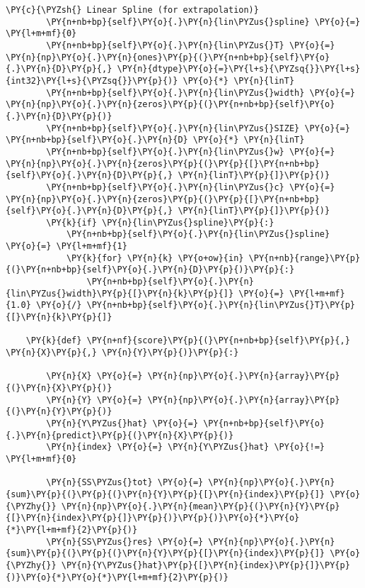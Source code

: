 \begin{Verbatim}[commandchars=\\\{\}]
        \PY{c}{\PYZsh{} Linear Spline (for extrapolation)}
        \PY{n+nb+bp}{self}\PY{o}{.}\PY{n}{lin\PYZus{}spline} \PY{o}{=} \PY{l+m+mf}{0}
        \PY{n+nb+bp}{self}\PY{o}{.}\PY{n}{lin\PYZus{}T} \PY{o}{=} \PY{n}{np}\PY{o}{.}\PY{n}{ones}\PY{p}{(}\PY{n+nb+bp}{self}\PY{o}{.}\PY{n}{D}\PY{p}{,} \PY{n}{dtype}\PY{o}{=}\PY{l+s}{\PYZsq{}}\PY{l+s}{int32}\PY{l+s}{\PYZsq{}}\PY{p}{)} \PY{o}{*} \PY{n}{linT}
        \PY{n+nb+bp}{self}\PY{o}{.}\PY{n}{lin\PYZus{}width} \PY{o}{=} \PY{n}{np}\PY{o}{.}\PY{n}{zeros}\PY{p}{(}\PY{n+nb+bp}{self}\PY{o}{.}\PY{n}{D}\PY{p}{)}
        \PY{n+nb+bp}{self}\PY{o}{.}\PY{n}{lin\PYZus{}SIZE} \PY{o}{=} \PY{n+nb+bp}{self}\PY{o}{.}\PY{n}{D} \PY{o}{*} \PY{n}{linT}
        \PY{n+nb+bp}{self}\PY{o}{.}\PY{n}{lin\PYZus{}w} \PY{o}{=} \PY{n}{np}\PY{o}{.}\PY{n}{zeros}\PY{p}{(}\PY{p}{[}\PY{n+nb+bp}{self}\PY{o}{.}\PY{n}{D}\PY{p}{,} \PY{n}{linT}\PY{p}{]}\PY{p}{)}
        \PY{n+nb+bp}{self}\PY{o}{.}\PY{n}{lin\PYZus{}c} \PY{o}{=} \PY{n}{np}\PY{o}{.}\PY{n}{zeros}\PY{p}{(}\PY{p}{[}\PY{n+nb+bp}{self}\PY{o}{.}\PY{n}{D}\PY{p}{,} \PY{n}{linT}\PY{p}{]}\PY{p}{)}
        \PY{k}{if} \PY{n}{lin\PYZus{}spline}\PY{p}{:}
            \PY{n+nb+bp}{self}\PY{o}{.}\PY{n}{lin\PYZus{}spline} \PY{o}{=} \PY{l+m+mf}{1}
            \PY{k}{for} \PY{n}{k} \PY{o+ow}{in} \PY{n+nb}{range}\PY{p}{(}\PY{n+nb+bp}{self}\PY{o}{.}\PY{n}{D}\PY{p}{)}\PY{p}{:}
                \PY{n+nb+bp}{self}\PY{o}{.}\PY{n}{lin\PYZus{}width}\PY{p}{[}\PY{n}{k}\PY{p}{]} \PY{o}{=} \PY{l+m+mf}{1.0} \PY{o}{/} \PY{n+nb+bp}{self}\PY{o}{.}\PY{n}{lin\PYZus{}T}\PY{p}{[}\PY{n}{k}\PY{p}{]}
        
    \PY{k}{def} \PY{n+nf}{score}\PY{p}{(}\PY{n+nb+bp}{self}\PY{p}{,} \PY{n}{X}\PY{p}{,} \PY{n}{Y}\PY{p}{)}\PY{p}{:}

        \PY{n}{X} \PY{o}{=} \PY{n}{np}\PY{o}{.}\PY{n}{array}\PY{p}{(}\PY{n}{X}\PY{p}{)}
        \PY{n}{Y} \PY{o}{=} \PY{n}{np}\PY{o}{.}\PY{n}{array}\PY{p}{(}\PY{n}{Y}\PY{p}{)}
        \PY{n}{Y\PYZus{}hat} \PY{o}{=} \PY{n+nb+bp}{self}\PY{o}{.}\PY{n}{predict}\PY{p}{(}\PY{n}{X}\PY{p}{)}
        \PY{n}{index} \PY{o}{=} \PY{n}{Y\PYZus{}hat} \PY{o}{!=} \PY{l+m+mf}{0}

        \PY{n}{SS\PYZus{}tot} \PY{o}{=} \PY{n}{np}\PY{o}{.}\PY{n}{sum}\PY{p}{(}\PY{p}{(}\PY{n}{Y}\PY{p}{[}\PY{n}{index}\PY{p}{]} \PY{o}{\PYZhy{}} \PY{n}{np}\PY{o}{.}\PY{n}{mean}\PY{p}{(}\PY{n}{Y}\PY{p}{[}\PY{n}{index}\PY{p}{]}\PY{p}{)}\PY{p}{)}\PY{o}{*}\PY{o}{*}\PY{l+m+mf}{2}\PY{p}{)}
        \PY{n}{SS\PYZus{}res} \PY{o}{=} \PY{n}{np}\PY{o}{.}\PY{n}{sum}\PY{p}{(}\PY{p}{(}\PY{n}{Y}\PY{p}{[}\PY{n}{index}\PY{p}{]} \PY{o}{\PYZhy{}} \PY{n}{Y\PYZus{}hat}\PY{p}{[}\PY{n}{index}\PY{p}{]}\PY{p}{)}\PY{o}{*}\PY{o}{*}\PY{l+m+mf}{2}\PY{p}{)}


\end{Verbatim}
